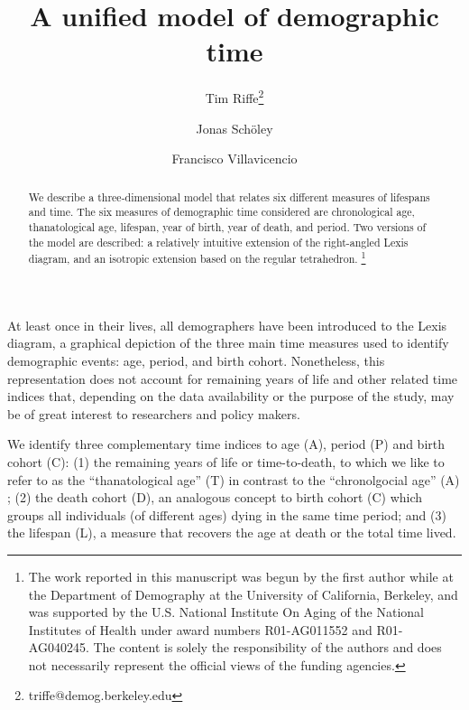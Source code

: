 \documentclass[11pt,oneside,a4paper]{article} %
\newcommand\ackn[1]{%
  \begingroup
  \renewcommand\thefootnote{}\footnote{#1}%
  \addtocounter{footnote}{-1}%
  \endgroup
}
\begin{document}
\title{A unified model of demographic time}

\author[1]{Tim Riffe\thanks{triffe@demog.berkeley.edu}}
\author[2,3]{Jonas Sch{\"o}ley}
\author[2,3]{Francisco Villavicencio}


\maketitle

\begin{abstract}
We describe a three-dimensional model that relates six different measures of
lifespans and time. The six measures of demographic time considered are
chronological age, thanatological age, lifespan, year of birth, year of death,
and period. Two versions of the model are described: a relatively intuitive
extension of the right-angled Lexis diagram, and an isotropic extension based on
the regular tetrahedron. \ackn{The work reported in this manuscript was begun by
the first author while at the Department of Demography at the University of
California, Berkeley, and was supported by the U.S.
National Institute On Aging of the National Institutes of Health under award
numbers R01-AG011552 and R01-AG040245. The content is solely the responsibility of the authors and does not necessarily represent the official views of the funding agencies.}
\end{abstract}
At least once in their lives, all demographers have been introduced to the Lexis diagram, a graphical depiction of the three main time measures used to identify demographic events: age, period, and birth cohort. Nonetheless, this representation does not account for remaining years of life and other related time indices that, depending on the data availability or the purpose of the study, may be of great interest to researchers and policy makers.

We identify three complementary time indices to age (A), period (P) and birth cohort (C): (1) the remaining years of life or time-to-death, to which we like to refer to as the ``thanatological age'' (T) in contrast to the ``chronolgocial age'' (A) \citep{riffe2015force}; (2) the death cohort (D), an analogous concept to birth cohort (C) which groups all individuals (of different ages) dying in the same time period; and (3) the lifespan (L), a measure that recovers the age at death or the total time lived.
\end{document}
